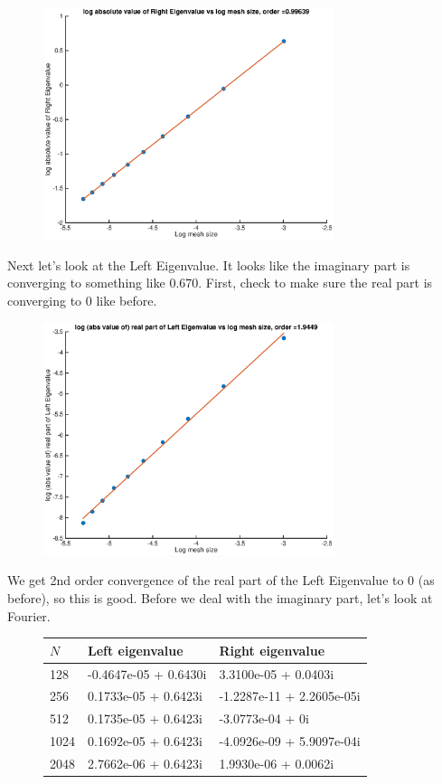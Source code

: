 \documentclass[12pt]{article}
\begin{document}
\begin{figure}[H]
\includegraphics[width=8.5cm]{1double2fdrighteigabs}
\end{figure}

Next let's look at the Left Eigenvalue. It looks like the imaginary part is converging to something like 0.670. First, check to make sure the real part is converging to 0 like before.

\begin{figure}[H]
\includegraphics[width=8.5cm]{1double2fdlefteigreal}
\end{figure}

We get 2nd order convergence of the real part of the Left Eigenvalue to 0 (as before), so this is good. Before we deal with the imaginary part, let's look at Fourier.

\begin{figure}[H]
\begin{tabular}{l|ll}
$N$    & Left eigenvalue      &  Right eigenvalue    \\ \hline
  128  &     -0.4647e-05 + 0.6430i &       3.3100e-05  +  0.0403i \\ 
  256  &      0.1733e-05 + 0.6423i &      -1.2287e-11  +  2.2605e-05i \\ 
  512  &      0.1735e-05 + 0.6423i &      -3.0773e-04  +  0i\\ 
  1024 &      0.1692e-05 + 0.6423i &      -4.0926e-09  +  5.9097e-04i\\
  2048 &      2.7662e-06 + 0.6423i &      1.9930e-06   +  0.0062i
\end{tabular}
\end{figure}
\end{document}
